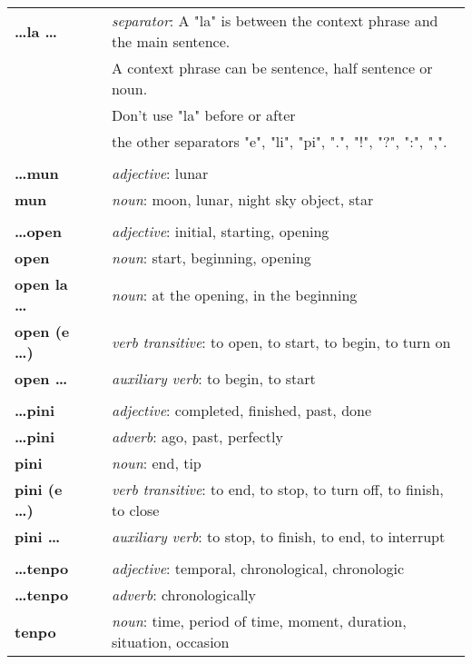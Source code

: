 \begin{supertabular}{p{2,5cm}|ll}
\textbf{\dots la \dots} && \textit{separator}: A "la" is between the context phrase and the main sentence. \\ && A context phrase can be sentence, half sentence or noun. \\ && Don't use "la" before or after \\ && the other separators "e", "li", "pi", ".", "!", "?", ":", ",".  \\ %
 && \\ %
\textbf{\dots mun} && \textit{adjective}: lunar \\ %
\textbf{mun} && \textit{noun}: moon, lunar, night sky object, star \\ %
 && \\ %
\textbf{\dots open} && \textit{adjective}: initial, starting, opening \\ %
\textbf{open} && \textit{noun}: start, beginning, opening \\ %
\textbf{open la \dots} && \textit{noun}: at the opening, in the beginning  \\ %
\textbf{open (e \dots)} && \textit{verb transitive}: to open, to start, to begin, to turn on \\ %
\textbf{open \dots } && \textit{auxiliary verb}: to begin, to start \\ %
 && \\ %
\textbf{\dots pini} && \textit{adjective}: completed, finished, past, done \\ %
\textbf{\dots pini} && \textit{adverb}: ago, past, perfectly \\ %
\textbf{pini} && \textit{noun}: end, tip \\ %
\textbf{pini (e \dots)} && \textit{verb transitive}: to end, to stop, to turn off, to finish, to close \\ %
\textbf{pini \dots } && \textit{auxiliary verb}: to stop, to finish, to end, to interrupt \\ %
 && \\ %
\textbf{\dots tenpo} && \textit{adjective}: temporal, chronological, chronologic \\ %
\textbf{\dots tenpo} && \textit{adverb}: chronologically \\ %
\textbf{tenpo} && \textit{noun}: time, period of time, moment, duration, situation, occasion \\ %

\end{supertabular}
